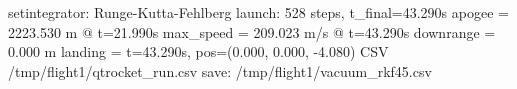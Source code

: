 \begin{console}
\ok setintegrator: Runge-Kutta-Fehlberg
\ok launch: 528 steps, t_final=43.290s
  apogee    = 2223.530 m @ t=21.990s
  max_speed = 209.023 m/s @ t=43.290s
  downrange = 0.000 m
  landing   = t=43.290s, pos=(0.000, 0.000, -4.080)
CSV /tmp/flight1/qtrocket_run.csv
\ok save: /tmp/flight1/vacuum_rkf45.csv
\end{console}
